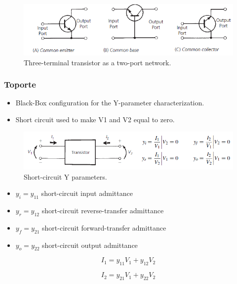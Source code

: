 \begin{figure} [H]
	\centering
	\includegraphics[width=\linewidth]{graphics/36.png}
	\caption{Three-terminal transistor as a two-port network.}
	\label{fig:36}
\end{figure}

\subsubsection{Toporte}

\begin{itemize}
	\item Black-Box configuration for the Y-parameter characterization.
	\item Short circuit used to make V1 and V2 equal to zero.
\end{itemize}

\begin{figure} [H]
	\centering
	\includegraphics[width=\linewidth]{graphics/37.png}
	\caption{Short-circuit Y parameters.}
	\label{fig:37}
\end{figure}

\begin{itemize}
	\item $y_i = y_{11}$ short-circuit input admittance
	\item $y_r = y_{12}$ short-circuit reverse-transfer admittance
	\item $y_f = y_{21}$ short-circuit forward-transfer admittance
	\item $y_o = y_{22}$ short-circuit output admittance
\end{itemize}

\begin{equation}
I_1 = y_{11} V_1 + y_{12} V_2
\end{equation}

\begin{equation}
I_2 = y_{21} V_1 + y_{22} V_2
\end{equation}

